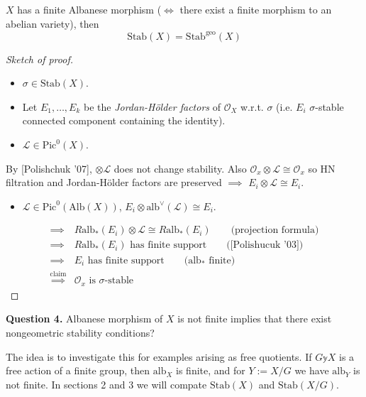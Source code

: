 \begin{theorem}
\label{theorem-Albanese-variety}
$X$ has a finite Albanese morphism ($\iff$
there exist a finite morphism to an abelian
variety), then
$$
\text{Stab}(X) = \text{Stab}^{\text{geo}}(X)
$$
\end{theorem}

\begin{proof}[Sketch of proof]
\begin{itemize}
\item $\sigma \in \text{Stab}(X)$.
\item Let $E_1,\ldots,E_k$ be the {\it
Jordan-H\"older factors} of $\mathcal{O}_X$
w.r.t. $\sigma$ (i.e. $E_i$ $\sigma$-stable
connected component containing the identity).
\item $\mathcal{L} \in \text{Pic}^0(X)$.
\end{itemize}
By [Polishchuk '07], $\otimes \mathcal{L}$
does not change stability. Also
$\mathcal{O}_x \otimes \mathcal{L}\cong
\mathcal{O}_x$ so HN filtration and
Jordan-H\"older factors are preserved
$\implies
$ $E_i \otimes \mathcal{L} \cong E_i$.
\begin{itemize}
\item $\mathcal{L} \in
\text{Pic}^0(\text{Alb}(X))$, $E_i \otimes
\text{alb}^\vee(\mathcal{L})\cong E_i$.
\end{itemize}
$$
\begin{aligned}
\implies & R\text{alb}_*(E_i)\otimes
\mathcal{L} \cong R\text{alb}_*(E_i)\qquad
\text{(projection formula)}\\
\implies &  R\text{alb}_*(E_i)\text{ has
finite support}\qquad
\text{([Polishucuk '03])}\\
\implies &E_i\text{ has finite support}\qquad
\text{($\text{alb}_*$ finite)}\\
\overset{\text{claim}}{\implies
}&\mathcal{O}_x\text{ is $\sigma$-stable}
\end{aligned}
$$
\end{proof}

\medskip\noindent
{\bf Question 4.} Albanese morphism of $X$ is
not finite implies that there exist
nongeometric stability conditions?

\medskip\noindent
The idea is to investigate this for examples
arising as free quotients. If $G \mathbb{y}
X$ is a free action of a finite group, then
$\text{alb}_X$ is finite, and for $Y:=X/G$ we
have $\text{alb}_Y$ is not finite. In
sections 2 and 3 we will compate
$\text{Stab}(X)$ and $\text{Stab}(X/G)$.


